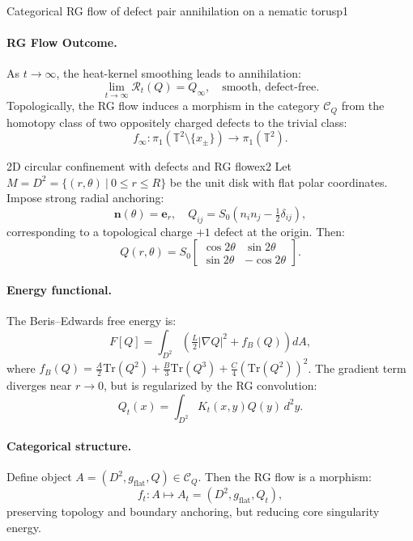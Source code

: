 \begin{example}{Categorical RG flow of defect pair annihilation on a nematic torus}{p1}
	\paragraph{RG Flow Outcome.}
	As \( t \to \infty \), the heat-kernel smoothing leads to annihilation:
	\[
	\lim_{t \to \infty} \mathcal{R}_t(Q) = Q_\infty, \quad \text{smooth, defect-free}.
	\]
	Topologically, the RG flow induces a morphism in the category \( \mathcal{C}_Q \) from the homotopy class of two oppositely charged defects to the trivial class:
	\[
	f_\infty: \pi_1(\mathbb{T}^2 \setminus \{x_\pm\}) \to \pi_1(\mathbb{T}^2).
	\]
	
	\end{example}
	
	\begin{example}{2D circular confinement with defects and RG flow}{ex2}
		Let \( M = D^2 = \{(r,\theta)\ |\ 0 \leqslant r \leqslant R\} \) be the unit disk with flat polar coordinates. Impose strong radial anchoring:
		\[
		\mathbf{n}(\theta) = \mathbf{e}_r, \quad Q_{ij} = S_0 \left(n_i n_j - \tfrac{1}{2} \delta_{ij} \right),
		\]
		corresponding to a topological charge \( +1 \) defect at the origin. Then:
		\[
		Q(r,\theta) = S_0 \begin{bmatrix}
			\cos 2\theta & \sin 2\theta \\
			\sin 2\theta & -\cos 2\theta
		\end{bmatrix}.
		\]
		
		\paragraph{Energy functional.}
		The Beris–Edwards free energy is:
		\[
		F[Q] = \int_{D^2} \left( \tfrac{L}{2} |\nabla Q|^2 + f_B(Q) \right) dA,
		\]
		where \( f_B(Q) = \tfrac{A}{2} \mathrm{Tr}(Q^2) + \tfrac{B}{3} \mathrm{Tr}(Q^3) + \tfrac{C}{4} (\mathrm{Tr}(Q^2))^2 \). The gradient term diverges near \( r \to 0 \), but is regularized by the RG convolution:
		\[
		Q_t(x) = \int_{D^2} K_t(x,y) Q(y)\, d^2y.
		\]
		
		\paragraph{Categorical structure.}
		Define object \( A = (D^2, g_{\text{flat}}, Q) \in \mathcal{C}_Q \). Then the RG flow is a morphism:
		\[
		f_t: A \mapsto A_t = (D^2, g_{\text{flat}}, Q_t),
		\]
		preserving topology and boundary anchoring, but reducing core singularity energy.

	\end{example}
	
